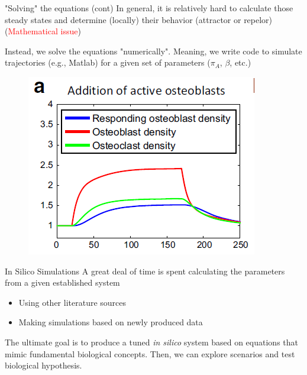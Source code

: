 \documentclass{beamer}
\begin{document}
\begin{frame}{"Solving" the equations (cont)}
	In general, it is relatively hard to calculate those steady states and determine (locally) their behavior (attractor  or repelor) (\textcolor{red}{Mathematical issue})
	
	Instead, we solve the equations "numerically". Meaning, we write code to simulate trajectories (e.g., Matlab) for a given set of parameters ($\pi_A$, $\beta$, etc.)
\begin{figure}[h]
	\centering
		\includegraphics[scale=0.45]{../Figures/fig_numeric_sol.png}
	
\end{figure}		 
	
	
\end{frame}

\begin{frame}{In Silico Simulations}
A great deal of time is spent calculating the parameters from a given established system
\begin{itemize}
	\item Using other literature sources
	\item Making simulations based on newly produced data	
\end{itemize}

The ultimate goal is to produce a tuned \textit{in silico} system based on  equations that mimic fundamental biological concepts. Then, we can explore scenarios and test biological hypothesis. 



\end{frame}
\end{document}
